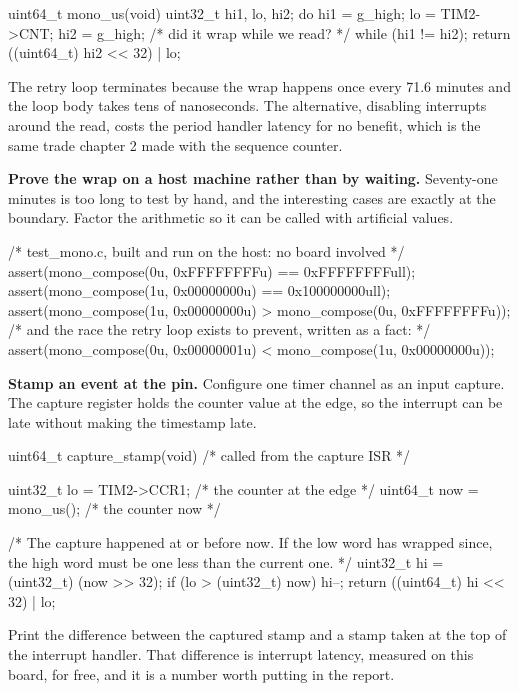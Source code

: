 \begin{steps}
\begin{ccode}
uint64_t mono_us(void)
{
    uint32_t hi1, lo, hi2;
    do {
        hi1 = g_high;
        lo  = TIM2->CNT;
        hi2 = g_high;                            /* did it wrap while we read? */
    } while (hi1 != hi2);
    return ((uint64_t) hi2 << 32) | lo;
}
\end{ccode}
The retry loop terminates because the wrap happens once every 71.6 minutes and
the loop body takes tens of nanoseconds. The alternative, disabling interrupts
around the read, costs the period handler latency for no benefit, which is the
same trade chapter 2 made with the sequence counter.

\item \textbf{Prove the wrap on a host machine rather than by waiting.}
Seventy-one minutes is too long to test by hand, and the interesting cases are
exactly at the boundary. Factor the arithmetic so it can be called with
artificial values.
\begin{ccode}
/* test_mono.c, built and run on the host: no board involved */
assert(mono_compose(0u, 0xFFFFFFFFu) == 0xFFFFFFFFull);
assert(mono_compose(1u, 0x00000000u) == 0x100000000ull);
assert(mono_compose(1u, 0x00000000u) > mono_compose(0u, 0xFFFFFFFFu));
/* and the race the retry loop exists to prevent, written as a fact: */
assert(mono_compose(0u, 0x00000001u) < mono_compose(1u, 0x00000000u));
\end{ccode}

\item \textbf{Stamp an event at the pin.} Configure one timer channel as an
input capture. The capture register holds the counter value at the edge, so the
interrupt can be late without making the timestamp late.
\begin{ccode}
uint64_t capture_stamp(void)                     /* called from the capture ISR */
{
    uint32_t lo = TIM2->CCR1;                    /* the counter at the edge */
    uint64_t now = mono_us();                    /* the counter now */

    /* The capture happened at or before now. If the low word has wrapped
       since, the high word must be one less than the current one. */
    uint32_t hi = (uint32_t) (now >> 32);
    if (lo > (uint32_t) now) hi--;
    return ((uint64_t) hi << 32) | lo;
}
\end{ccode}
Print the difference between the captured stamp and a stamp taken at the top of
the interrupt handler. That difference is interrupt latency, measured on this
board, for free, and it is a number worth putting in the report.


\end{steps}
